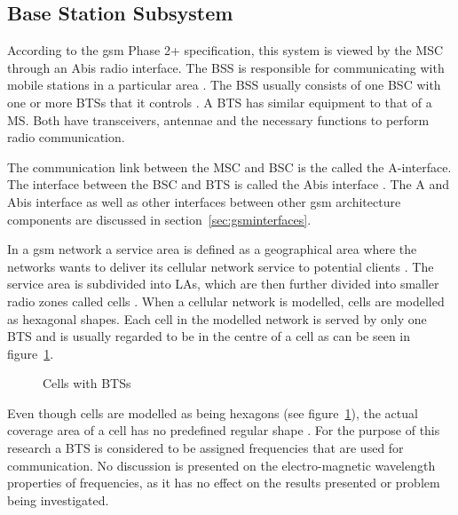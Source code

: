 \subsection{Base Station Subsystem}

According to the \gls{gsm} Phase 2+ specification, this system is viewed by the \gls{MSC} through an Abis radio interface. The \gls{BSS} is responsible for communicating with mobile stations in a particular area \cite{Eisenblatter}. The \gls{BSS} usually consists of one \gls{BSC} with one or more \glspl{BTS} that it controls \cite{Eisenblatter}. A \gls{BTS} has similar equipment to that of a MS\cite{GSMSysEngin}. Both have transceivers, antennae and the necessary functions to perform radio communication.

The communication link between the \gls{MSC} and \gls{BSC} is the called the A-interface. The interface between the \gls{BSC} and \gls{BTS} is called the Abis interface \cite{Eisenblatter}. The A and Abis interface as well as other interfaces between other \gls{gsm} architecture components are discussed in section~\ref{sec:gsminterfaces}.  

In a \gls{gsm} network a service area is defined as a geographical area where the networks wants to deliver its cellular network service to potential clients \cite{GSMArchitectureProtocolsServices, Karen2004}. The service area is subdivided into \glspl{LA}, which are then further divided into smaller radio zones called cells \cite{GSMSecurInTeleNetwork}. When a cellular network is modelled, cells are modelled as hexagonal shapes. Each cell in the modelled network is served by only one \gls{BTS} and is usually regarded to be in the centre of a cell as can be seen in figure~\ref{fig:GSMCell}\cite{GSMArchitectureProtocolsServices}. 
\begin{figure}[H]
	\begin{centering}
		
		\caption{Cells with BTSs}
		\label{fig:GSMCell}
	\end{centering}
\end{figure}
Even though cells are modelled as being hexagons (see figure~\ref{fig:GSMCell}), the actual coverage area of a cell has no predefined regular shape \cite{GSMArchitectureProtocolsServices}.
For the purpose of this research a \gls{BTS} is considered to be assigned frequencies that are used for communication. No discussion is presented on the electro-magnetic wavelength properties of frequencies, as it has no effect on the results presented or problem being investigated.

